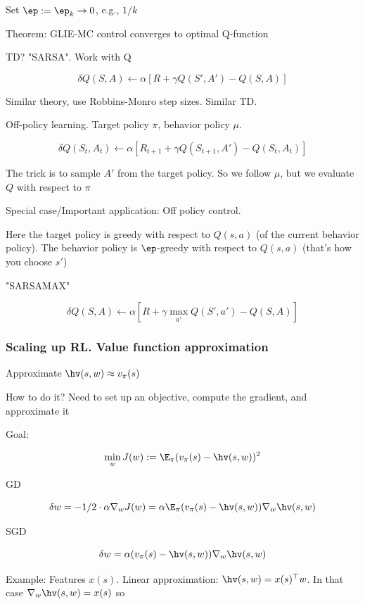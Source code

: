 \documentclass[english]{article}
\begin{document}
Set $\ep:=\ep_k\to 0$, e.g., $1/k$


Theorem: GLIE-MC control converges to optimal Q-function

\item TD? "SARSA". Work with Q

$$\delta Q(S,A)
\gets
\alpha [
R+\gamma Q(S',A')-Q(S,A)]
$$

Similar theory, use Robbins-Monro step sizes. Similar TD.

\item Off-policy learning. Target policy $\pi$, behavior policy $\mu$. 

$$\delta Q(S_t,A_t)
\gets
\alpha [
R_{t+1}+\gamma Q(S_{t+1},A')-Q(S_{t},A_{t})]
$$

The trick is to sample $A'$ from the target policy. So we follow $\mu$, but we evaluate $Q$ with respect to $\pi$

\item Special case/Important application: Off policy control. 

Here the target policy is greedy with respect to $Q(s,a)$ (of the current behavior policy). The behavior policy is $\ep$-greedy with respect to $Q(s,a)$ (that's how you choose $s'$)

"SARSAMAX"

$$\delta Q(S,A)
\gets
\alpha [
R+\gamma \max_{a'} Q(S',a')-Q(S,A)]
$$


\eenum 


\subsubsection{Scaling up RL. Value function approximation}
\benum
\item Approximate $\hv (s,w) \approx v_\pi(s)$

How to do it? Need to set up an objective, compute the gradient, and approximate it

Goal: 

$$\min_w J(w):=\E_\pi(v_\pi(s)-\hv(s,w))^2
$$

GD

$$\delta w=-1/2\cdot\alpha \nabla_w J(w)
=\alpha\E_\pi(v_\pi(s)-\hv(s,w))\nabla_w\hv(s,w)
$$

SGD

$$\delta w
=\alpha(v_\pi(s)-\hv(s,w))\nabla_w\hv(s,w)
$$



\item Example:  Features $x(s)$. Linear approximation: $\hv(s,w) =x(s)^\top w$. In that case $\nabla_w\hv(s,w) = x(s)$ so
\end{document}
